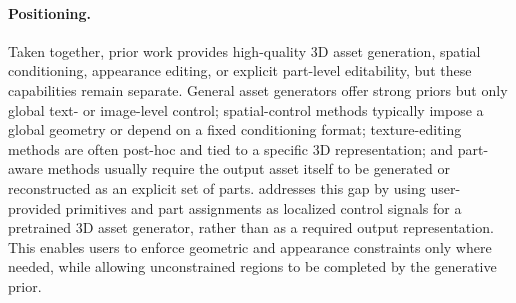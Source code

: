 

\paragraph{Positioning.}
Taken together, prior work provides high-quality 3D asset generation, spatial conditioning, appearance editing, or explicit part-level editability, but these capabilities remain separate. General asset generators offer strong priors but only global text- or image-level control; spatial-control methods typically impose a global geometry or depend on a fixed conditioning format; texture-editing methods are often post-hoc and tied to a specific 3D representation; and part-aware methods usually require the output asset itself to be generated or reconstructed as an explicit set of parts. \methodname addresses this gap by using user-provided primitives and part assignments as localized control signals for a pretrained 3D asset generator, rather than as a required output representation. This enables users to enforce geometric and appearance constraints only where needed, while allowing unconstrained regions to be completed by the generative prior.
